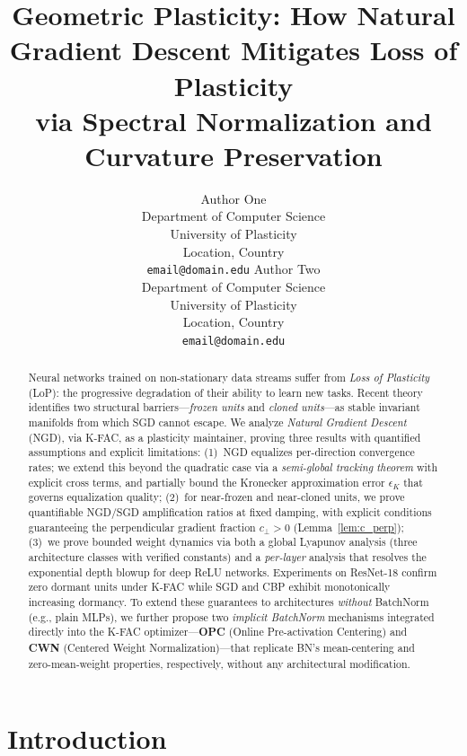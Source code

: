 \documentclass{article}
\title{Geometric Plasticity: How Natural Gradient Descent Mitigates Loss of Plasticity \\ via Spectral Normalization and Curvature Preservation}
\author{%
  Author One\\
  Department of Computer Science\\
  University of Plasticity\\
  Location, Country\\
  \texttt{email@domain.edu}
  \And
  Author Two\\
  Department of Computer Science\\
  University of Plasticity\\
  Location, Country\\
  \texttt{email@domain.edu}
}
\theoremstyle{plain}
\theoremstyle{definition}
\theoremstyle{remark}
\begin{document}
\small

\maketitle

\begin{abstract}
Neural networks trained on non-stationary data streams suffer from \emph{Loss of Plasticity} (LoP): the progressive degradation of their ability to learn new tasks. Recent theory identifies two structural barriers---\emph{frozen units} and \emph{cloned units}---as stable invariant manifolds from which SGD cannot escape. We analyze \emph{Natural Gradient Descent} (NGD), via K-FAC, as a plasticity maintainer, proving three results with quantified assumptions and explicit limitations:
(1)~NGD equalizes per-direction convergence rates; we extend this beyond the quadratic case via a \emph{semi-global tracking theorem} with explicit cross terms, and partially bound the Kronecker approximation error $\epsilon_K$ that governs equalization quality;
(2)~for near-frozen and near-cloned units, we prove quantifiable NGD/SGD amplification ratios at fixed damping, with explicit conditions guaranteeing the perpendicular gradient fraction $c_\perp > 0$ (Lemma~\ref{lem:c_perp});
(3)~we prove bounded weight dynamics via both a global Lyapunov analysis (three architecture classes with verified constants) and a \emph{per-layer} analysis that resolves the exponential depth blowup for deep ReLU networks. Experiments on ResNet-18 confirm zero dormant units under K-FAC while SGD and CBP exhibit monotonically increasing dormancy.
To extend these guarantees to architectures \emph{without} BatchNorm (e.g., plain MLPs), we further propose two \emph{implicit BatchNorm} mechanisms integrated directly into the K-FAC optimizer---\textbf{OPC} (Online Pre-activation Centering) and \textbf{CWN} (Centered Weight Normalization)---that replicate BN's mean-centering and zero-mean-weight properties, respectively, without any architectural modification.
\end{abstract}

\section{Introduction}
\label{sec:intro}
\end{document}
